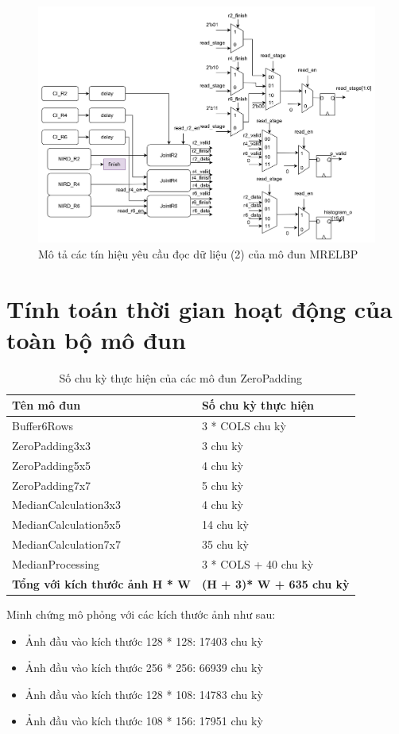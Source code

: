 \begin{figure}[!ht]
	\centering
	\includegraphics[width=\linewidth]{figures/topRTL1.png}
	\caption{Mô tả các tín hiệu yêu cầu đọc dữ liệu (2) của mô đun MRELBP}
	\label{fig:topRTL1}
\end{figure}
\section{Tính toán thời gian hoạt động của toàn bộ mô đun}

\begin{table}[H]
	\centering
	\renewcommand{\arraystretch}{1.3}
	\begin{tabular}{|p{6cm} p{5cm} |}
		\hline
		\rowcolor{gray!30}
		\textbf{Tên mô đun} & \textbf{Số chu kỳ thực hiện}  \\
		\hline
		Buffer6Rows  & 3 * COLS chu kỳ
		\\ \hline
		ZeroPadding3x3 & 3 chu kỳ
		\\ \hline
		ZeroPadding5x5 & 4 chu kỳ
		\\ \hline
		ZeroPadding7x7 & 5 chu kỳ
		\\ \hline
		MedianCalculation3x3 & 4 chu kỳ
		\\ \hline
		MedianCalculation5x5 & 14 chu kỳ
		\\ \hline
		MedianCalculation7x7 & 35 chu kỳ
		\\ \hline
		MedianProcessing & 3 * COLS + 40 chu kỳ

		\\ \hline
		\textbf{Tổng với kích thước ảnh H * W} & \textbf{(H + 3)* W + 635 chu kỳ}
		\\ \hline
	\end{tabular}
	\caption{Số chu kỳ thực hiện của các mô đun ZeroPadding}
	\label{tab:numberOfCycleZeroPadding}
\end{table}
Minh chứng mô phỏng với các kích thước ảnh như sau:
\begin{itemize}
	\item Ảnh đầu vào kích thước 128 * 128: 17403 chu kỳ
	\item Ảnh đầu vào kích thước 256 * 256: 66939 chu kỳ
	\item Ảnh đầu vào kích thước 128 * 108: 14783 chu kỳ
	\item Ảnh đầu vào kích thước 108 * 156: 17951 chu kỳ

\end{itemize}

